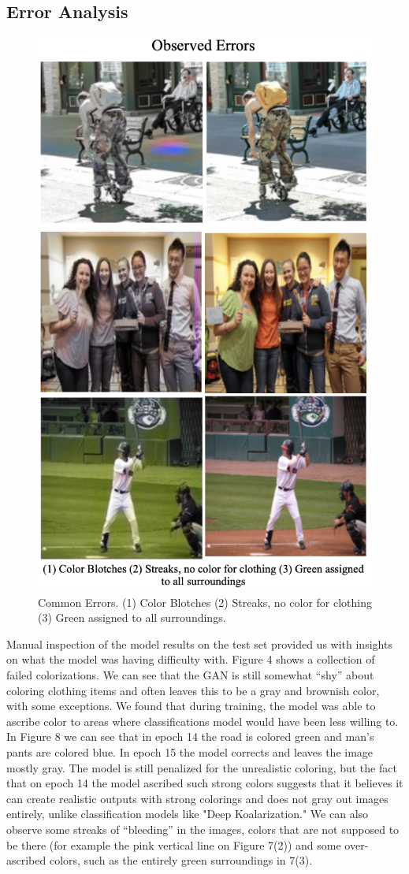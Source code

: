 \documentclass[10pt,twocolumn,letterpaper]{article}
\begin{document}
\subsection{Error Analysis}
\begin{figure}
    \centering
    \includegraphics[width=0.5\linewidth]{common errors.png}
    \caption{Common Errors. (1) Color Blotches (2) Streaks, no color for clothing (3) Green assigned to all surroundings.}
    \label{fig:enter-label}
\end{figure}
Manual inspection of the model results on the test set provided us with insights on what the model was having difficulty with. Figure 4 shows a collection of failed colorizations. We can see that the GAN is still somewhat “shy” about coloring clothing items and often leaves this to be a gray and brownish color, with some exceptions. We found that during training, the model was able to ascribe color to areas where classifications model would have been less willing to. In Figure 8 we can see that in epoch 14 the road is colored green and man’s pants are colored blue. In epoch 15 the model corrects and leaves the image mostly gray. The model is still penalized for the unrealistic coloring, but the fact that on epoch 14 the model ascribed such strong colors suggests that it believes it can create realistic outputs with strong colorings and does not gray out images entirely, unlike classification models like "Deep Koalarization." We can also observe some streaks of “bleeding” in the images, colors that are not supposed to be there (for example the pink vertical line on Figure 7(2)) and some over-ascribed colors, such as the entirely green surroundings in 7(3). 
\end{document}
